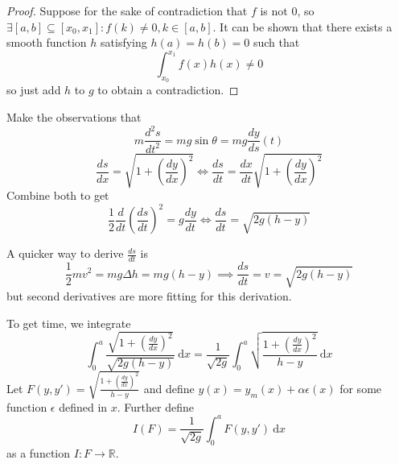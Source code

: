 \documentclass[11pt]{scrartcl}
\begin{document}
\begin{proof}
    Suppose for the sake of contradiction that $f$ is not $0$, so $\exists [a,b] \subseteq [x_0,x_1] : f(k) \neq 0, k\in[a,b]$. It can be shown that there exists a smooth function $h$ satisfying $h(a) = h(b) = 0$ such that \[\int_{x_0}^{x_1} f(x)h(x) \neq 0\] so just add $h$ to $g$ to obtain a contradiction. 

    


\end{proof}

Make the observations that \[m\frac{d^2s}{dt^2} = mg\sin \theta = mg\frac{dy}{ds}(t)\] \[\frac{ds}{dx} =\sqrt{1 + \left (\frac{dy}{dx}\right )^2} \iff \frac{ds}{dt} =\frac{dx}{dt} \sqrt{1 + \left (\frac{dy}{dx} \right )^2}\] Combine both to get \[\frac{1}{2}\frac{d}{dt}\left ( \frac{ds}{dt} \right )^2 = g \frac{dy}{dt} \iff \frac{ds}{dt} = \sqrt{2g(h-y)}\] 
\begin{remark*}
    A quicker way to derive $\frac{ds}{dt}$ is \[\frac{1}{2} mv^2 = mg\Delta h = mg(h-y) \implies \frac{ds}{dt} = v = \sqrt{2g(h-y)}\] but second derivatives are more fitting for this derivation. 
\end{remark*}
To get time, we integrate \[\int_0^a \frac{\sqrt{1 + \left  ( \frac{dy}{dx} \right )^2}}{\sqrt{2g(h-y)}} \ \mathrm dx = \frac{1}{\sqrt{2g}}\int_0^a \sqrt{\frac{1 + \left ( \frac{dy}{dx}\right )^2}{h-y}} \ \mathrm dx\] Let $F(y, y') = \sqrt{\frac{1 + \left ( \frac{dy}{dx} \right )^2}{h-y}}$ and define $y(x) = y_m(x) + \alpha \epsilon(x)$ for some function $\epsilon$ defined in $x$. Further define \[I(F) = \frac{1}{\sqrt{2g}} \int_0^a F(y,y')\ \mathrm dx\] as a function $I : F \to \mathbb R$. 
\end{document}
